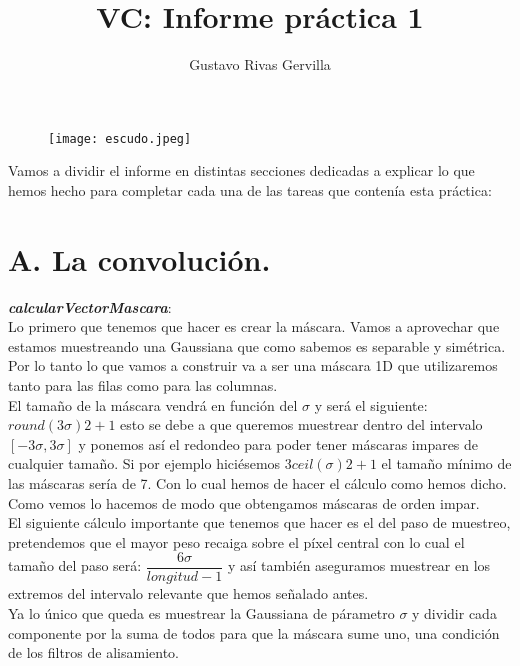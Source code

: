 \documentclass[10pt,a4paper]{article}
\author{Gustavo Rivas Gervilla}
\title{\textbf{VC: Informe práctica 1}}
\date{}
\begin{document}
\maketitle

\begin{figure}[H]
\centering
\texttt{[image: escudo.jpeg]}
\end{figure}

\newpage

Vamos a dividir el informe en distintas secciones dedicadas a explicar lo que hemos hecho para completar cada una de las tareas que contenía esta práctica:

\section*{A. La convolución.}

\textbf{\textit{calcularVectorMascara}}:\\

Lo primero que tenemos que hacer es crear la máscara. Vamos a aprovechar que estamos muestreando una Gaussiana que como sabemos es separable y simétrica. Por lo tanto lo que vamos a construir va a ser una máscara 1D que utilizaremos tanto para las filas como para las columnas.\\

El tamaño de la máscara vendrá en función del $\sigma$ y será el siguiente: $round(3\sigma)2+1$ esto se debe a que queremos muestrear dentro del intervalo $[-3\sigma , 3\sigma]$ y ponemos así el redondeo para poder tener máscaras impares de cualquier tamaño. Si por ejemplo hiciésemos $3ceil(\sigma)2+1 $ el tamaño mínimo de las máscaras sería de 7. Con lo cual hemos de hacer el cálculo como hemos dicho. Como vemos lo hacemos de modo que obtengamos máscaras de orden impar.\\

El siguiente cálculo importante que tenemos que hacer es el del paso de muestreo, pretendemos que el mayor peso recaiga sobre el píxel central con lo cual el tamaño del paso será: $\dfrac{6\sigma}{longitud - 1}$ y así también aseguramos muestrear en los extremos del intervalo relevante que hemos señalado antes.\\

Ya lo único que queda es muestrear la Gaussiana de párametro $\sigma$ y dividir cada componente por la suma de todos para que la máscara sume uno, una condición de los filtros de alisamiento.\\
\end{document}
